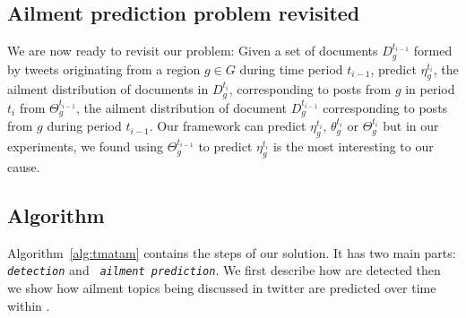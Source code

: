 \subsection{Ailment prediction problem revisited}
\label{subsec:problem}
We are now ready to revisit our problem: Given a set of
documents $D_g^{t_{i-1}}$ formed by tweets originating from a region
$g \in G$ during time period $t_{i-1}$, predict $\eta_g^{t_i}$, the
ailment distribution of documents in $D_g^{t_i}$, corresponding to
posts from $g$ in period $t_i$ from $\Theta_g^{t_{i-1}}$, the ailment
distribution of document $D_g^{t_{i-1}}$ corresponding to posts from
$g$ during period $t_{i-1}$.  Our framework can predict $\eta_g^{t_i}$, $\theta_g^{t_i}$ or $\Theta_g^{t_i}$
 but in our experiments, we found  using $\Theta_g^{t_{i-1}}$ to predict $\eta_g^{t_i}$ is the most interesting to our cause.  

\subsection{Algorithm}
\label{subsec:tmalg}
Algorithm~\ref{alg:tmatam} contains the steps of our solution. It has 
two main parts: {\texttt{\emph{ \change detection}}} and {\texttt{\emph{ ailment prediction}}}. 
We first describe how \changes are detected then we show how ailment topics being discussed in twitter 
are predicted over time within \seasons.


